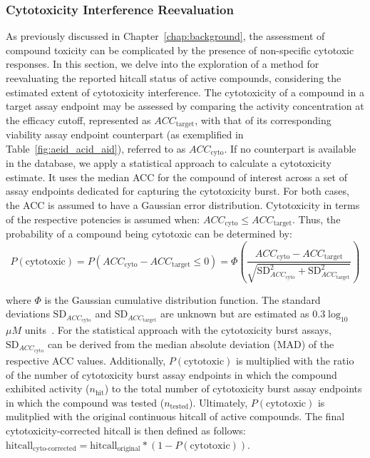 \subsubsection{Cytotoxicity Interference Reevaluation}
As previously discussed in Chapter~\ref{chap:background}, the assessment of compound toxicity can be complicated by the presence of non-specific cytotoxic responses. In this section, we delve into the exploration of a method for reevaluating the reported hitcall status of active compounds, considering the estimated extent of cytotoxicity interference. The cytotoxicity of a compound in a target assay endpoint may be assessed by comparing the activity concentration at the efficacy cutoff, represented as $ACC_{\text{target}}$, with that of its corresponding viability assay endpoint counterpart (as exemplified in Table~\ref{fig:aeid_acid_aid}), referred to as $ACC_{\text{cyto}}$. If no counterpart is available in the database, we apply a statistical approach to calculate a cytotoxicity estimate. It uses the median ACC for the compound of interest across a set of assay endpoints dedicated for capturing the cytotoxicity burst. For both cases, the ACC is assumed to have a Gaussian error distribution. Cytotoxicity in terms of the respective potencies is assumed when: $ACC_{\text{cyto}} \leq ACC_{\text{target}}$. Thus, the probability of a compound being cytotoxic can be determined by:
\[
P(\text{cytotoxic}) = P(ACC_{\text{cyto}} - ACC_{\text{target}} \leq 0) = \Phi\left(\frac{ACC_{\text{cyto}} - ACC_{\text{target}}}{\sqrt{\text{SD}_{ACC_{\text{cyto}}}^2 + \text{SD}_{ACC_{\text{target}}}^2 }}\right)
\]
    
where $\Phi$ is the Gaussian cumulative distribution function. The standard deviations $\text{SD}_{ACC_{\text{cyto}}}$ and $\text{SD}_{ACC_{\text{target}}}$ are unknown but are estimated as $0.3 \log_{10}$ ${\mu M}$ units~\cite{watt2018}. For the statistical approach with the cytotoxicity burst assays, $\text{SD}_{ACC_{\text{cyto}}}$ can be derived from the median absolute deviation (MAD) of the respective ACC values. Additionally, $P(\text{cytotoxic})$ is multiplied with the ratio of the number of cytotoxicity burst assay endpoints in which the compound exhibited activity ($n_{\text{hit}}$) to the total number of cytotoxicity burst assay endpoints in which the compound was tested ($n_{\text{tested}}$). 
Ultimately, $P(\text{cytotoxic})$ is mulitplied with the original continuous hitcall of active compounds. The final cytotoxicity-corrected hitcall is then defined as follows: $\text{hitcall}_{\text{cyto-corrected}} = \text{hitcall}_{\text{original}} * (1 - P(\text{cytotoxic}))$.

